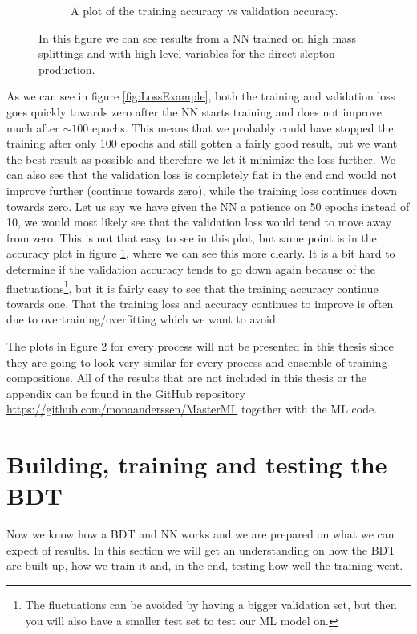 \begin{figure}[H]
\begin{subfigure}[t!]{0.49\textwidth}
        \caption{A plot of the training accuracy vs validation accuracy.}
        \label{fig:AccExample}
    \end{subfigure}
    \caption{In this figure we can see results from a NN trained on high mass splittings and with high level variables for the direct slepton production.}
    \label{fig:resLossAccExample}
\end{figure}

As we can see in figure \ref{fig:LossExample}, both the training and validation loss goes quickly towards zero after the NN starts training and does not improve much after $\sim 100$ epochs. This means that we probably could have stopped the training after only 100 epochs and still gotten a fairly good result, but we want the best result as possible and therefore we let it minimize the loss further. We can also see that the validation loss is completely flat in the end and would not improve further (continue towards zero), while the training loss continues down towards zero. Let us say we have given the NN a patience on 50 epochs instead of 10, we would most likely see that the validation loss would tend to move away from zero. This is not that easy to see in this plot, but same point is in the accuracy plot in figure \ref{fig:AccExample}, where we can see this more clearly. It is a bit hard to determine if the validation accuracy tends to go down again because of the fluctuations\footnote{The fluctuations can be avoided by having a bigger validation set, but then you will also have a smaller test set to test our ML model on.}, but it is fairly easy to see that the training accuracy continue towards one. That the training loss and accuracy continues to improve is often due to overtraining/overfitting which we want to avoid.

The plots in figure \ref{fig:resLossAccExample} for every process will not be presented in this thesis since they are going to look very similar for every process and ensemble of training compositions. All of the results that are not included in this thesis or the appendix can be found in the GitHub repository \url{https://github.com/monaanderssen/MasterML} together with the ML code.


\section{Building, training and testing the BDT}
Now we know how a BDT and NN works and we are prepared on what we can expect of results. In this section we will get an understanding on how the BDT are built up, how we train it and, in the end, testing how well the training went.

